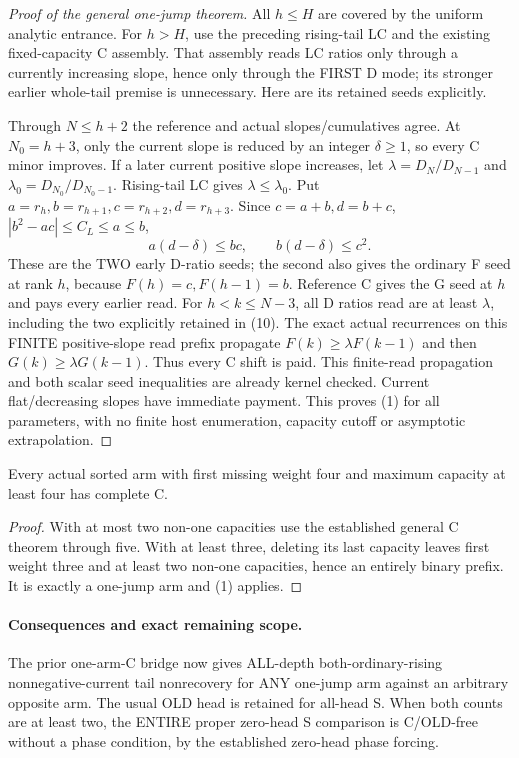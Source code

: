 \begin{proof}[Proof of the general one-jump theorem]
All $h\le H$ are covered by the uniform analytic entrance.
For $h>H$, use the preceding rising-tail LC and the existing
fixed-capacity C assembly.  That assembly reads LC ratios only
through a currently increasing slope, hence only through the FIRST
D mode; its stronger earlier whole-tail premise is unnecessary.
Here are its retained seeds explicitly.

Through $N\le h+2$ the reference and actual slopes/cumulatives agree.
At $N_0=h+3$, only the current slope is reduced by an integer
$\delta\ge1$, so every C minor improves.  If a later current
positive slope increases, let $\lambda=D_N/D_{N-1}$ and
$\lambda_0=D_{N_0}/D_{N_0-1}$.  Rising-tail LC gives
$\lambda\le\lambda_0$.
Put $a=r_h,b=r_{h+1},c=r_{h+2},d=r_{h+3}$.
Since $c=a+b,d=b+c$, $|b^2-ac|\le C_L\le a\le b$,
\[
       a(d-\delta)\le bc,\qquad b(d-\delta)\le c^2.     \tag{10}
\]
These are the TWO early D-ratio seeds; the second also gives the
ordinary F seed at rank $h$, because $F(h)=c,F(h-1)=b$.
Reference C gives the G seed at $h$ and pays every earlier read.
For $h<k\le N-3$, all D ratios read are at least $\lambda$,
including the two explicitly retained in (10).
The exact actual recurrences on this FINITE positive-slope read prefix
propagate $F(k)\ge\lambda F(k-1)$ and then
$G(k)\ge\lambda G(k-1)$.  Thus every C shift is paid.
This finite-read propagation and both scalar seed inequalities are
already kernel checked.  Current flat/decreasing slopes have immediate
payment.  This proves (1) for all parameters, with no finite host
enumeration, capacity cutoff or asymptotic extrapolation.
\end{proof}

\begin{corollary}
Every actual sorted arm with first missing weight four and maximum
capacity at least four has complete C.
\end{corollary}
\begin{proof}
With at most two non-one capacities use the established general C
theorem through five.  With at least three, deleting its last capacity
leaves first weight three and at least two non-one capacities, hence
an entirely binary prefix.  It is exactly a one-jump arm and (1) applies.
\end{proof}

\paragraph{Consequences and exact remaining scope.}
The prior one-arm-C bridge now gives ALL-depth both-ordinary-rising
nonnegative-current tail nonrecovery for ANY one-jump arm against
an arbitrary opposite arm.  The usual OLD head is retained for
all-head S.  When both counts are at least two, the ENTIRE proper
zero-head S comparison is C/OLD-free without a phase condition,
by the established zero-head phase forcing.

